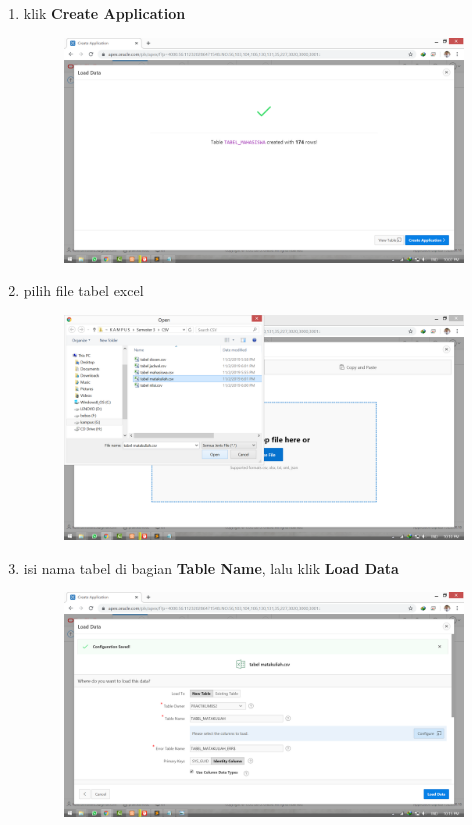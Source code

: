 \documentclass[11pt]{article}
\begin{document}
\begin{enumerate}
\newpage
\item klik \textbf{Create Application}
	\begin{figure}[h]
        \centerline{\includegraphics[scale=0.1]{img/18.png}}
        \centering
        \caption{}
		\label{langkah24}
	\end{figure}
	
\item pilih file tabel excel
	\begin{figure}[h]
        \centerline{\includegraphics[scale=0.1]{img/19.png}}
        \centering
        \caption{}
		\label{langkah25}
	\end{figure}
	
\newpage
\item isi nama tabel di bagian \textbf{Table Name}, lalu klik \textbf{Load Data}
	\begin{figure}[h]
        \centerline{\includegraphics[scale=0.1]{img/20.png}}
        \centering
        \caption{}
		\label{langkah26}
	\end{figure}
	

\end{enumerate}
\end{document}
